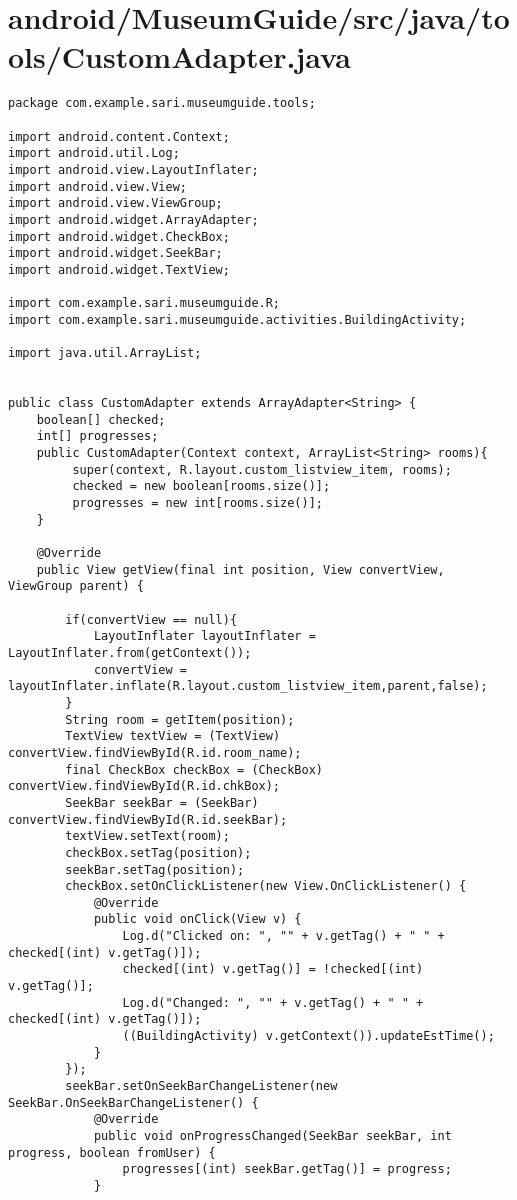 \section{android/MuseumGuide/src/java/tools/CustomAdapter.java}
\begin{lstlisting}package com.example.sari.museumguide.tools;

import android.content.Context;
import android.util.Log;
import android.view.LayoutInflater;
import android.view.View;
import android.view.ViewGroup;
import android.widget.ArrayAdapter;
import android.widget.CheckBox;
import android.widget.SeekBar;
import android.widget.TextView;

import com.example.sari.museumguide.R;
import com.example.sari.museumguide.activities.BuildingActivity;

import java.util.ArrayList;


public class CustomAdapter extends ArrayAdapter<String> {
    boolean[] checked;
    int[] progresses;
    public CustomAdapter(Context context, ArrayList<String> rooms){
         super(context, R.layout.custom_listview_item, rooms);
         checked = new boolean[rooms.size()];
         progresses = new int[rooms.size()];
    }

    @Override
    public View getView(final int position, View convertView, ViewGroup parent) {

        if(convertView == null){
            LayoutInflater layoutInflater = LayoutInflater.from(getContext());
            convertView = layoutInflater.inflate(R.layout.custom_listview_item,parent,false);
        }
        String room = getItem(position);
        TextView textView = (TextView) convertView.findViewById(R.id.room_name);
        final CheckBox checkBox = (CheckBox) convertView.findViewById(R.id.chkBox);
        SeekBar seekBar = (SeekBar) convertView.findViewById(R.id.seekBar);
        textView.setText(room);
        checkBox.setTag(position);
        seekBar.setTag(position);
        checkBox.setOnClickListener(new View.OnClickListener() {
            @Override
            public void onClick(View v) {
                Log.d("Clicked on: ", "" + v.getTag() + " " + checked[(int) v.getTag()]);
                checked[(int) v.getTag()] = !checked[(int) v.getTag()];
                Log.d("Changed: ", "" + v.getTag() + " " + checked[(int) v.getTag()]);
                ((BuildingActivity) v.getContext()).updateEstTime();
            }
        });
        seekBar.setOnSeekBarChangeListener(new SeekBar.OnSeekBarChangeListener() {
            @Override
            public void onProgressChanged(SeekBar seekBar, int progress, boolean fromUser) {
                progresses[(int) seekBar.getTag()] = progress;
            }


\end{lstlisting}
